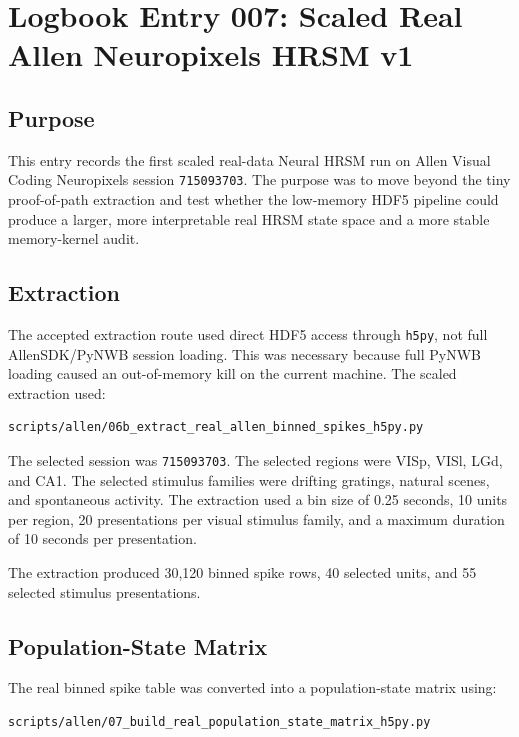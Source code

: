 \section{Logbook Entry 007: Scaled Real Allen Neuropixels HRSM v1}
\label{sec:logbook-entry-007-scaled-real-allen-v1}

\subsection{Purpose}

This entry records the first scaled real-data Neural HRSM run on Allen Visual Coding Neuropixels session \texttt{715093703}. The purpose was to move beyond the tiny proof-of-path extraction and test whether the low-memory HDF5 pipeline could produce a larger, more interpretable real HRSM state space and a more stable memory-kernel audit.

\subsection{Extraction}

The accepted extraction route used direct HDF5 access through \texttt{h5py}, not full AllenSDK/PyNWB session loading. This was necessary because full PyNWB loading caused an out-of-memory kill on the current machine. The scaled extraction used:

\begin{verbatim}
scripts/allen/06b_extract_real_allen_binned_spikes_h5py.py
\end{verbatim}

The selected session was \texttt{715093703}. The selected regions were VISp, VISl, LGd, and CA1. The selected stimulus families were drifting gratings, natural scenes, and spontaneous activity. The extraction used a bin size of 0.25 seconds, 10 units per region, 20 presentations per visual stimulus family, and a maximum duration of 10 seconds per presentation.

The extraction produced 30,120 binned spike rows, 40 selected units, and 55 selected stimulus presentations.

\subsection{Population-State Matrix}

The real binned spike table was converted into a population-state matrix using:

\begin{verbatim}
scripts/allen/07_build_real_population_state_matrix_h5py.py
\end{verbatim}

